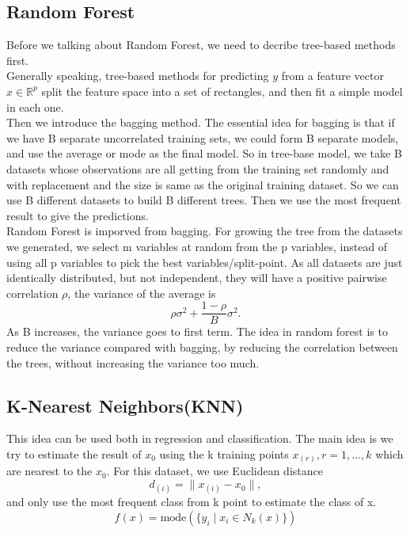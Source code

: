 \documentclass[12pt]{article}
\begin{document}
\subsection{Random Forest} 
Before we talking about Random Forest, we need to decribe tree-based methods first.\\ 
Generally speaking, tree-based methods for predicting $y$ from a feature vector $x\in \mathbb{R}^p$ split the feature space into a set of rectangles, and then fit a simple model in each one. \cite[p.305-310]{friedman2001elements} \\
Then we introduce the bagging method. The essential idea for bagging is that if we have B separate uncorrelated training sets, we could form B separate models, and use the average or mode as the final model. So in tree-base model, we take B datasets whose observations are all getting from the training set randomly and with replacement and the size is same as the original training dataset. So we can use B different datasets to build B different trees. Then we use the most frequent result to give the predictions. \cite[p282-283]{friedman2001elements} \\
Random Forest is imporved from bagging. For growing the tree from the datasets we generated, we select m variables at random from the p variables, instead of using all p variables to pick the best variables/split-point. As all datasets are just identically distributed, but not independent, they will have a positive pairwise correlation $\rho$, the variance of the average is $$\rho\sigma^2+\frac{1-\rho}{B}\sigma^2.$$ As B increases, the variance goes to first term. The idea in random forest is to reduce the variance compared with bagging, by reducing the correlation between the trees, without increasing the variance too much. \cite[p.606-607]{friedman2001elements}

\subsection{K-Nearest Neighbors(KNN)} 
This idea can be used both in regression and classification. The main idea is we try to estimate the result of $x_0$ using the k training points $x_{(r)}, r=1,...,k$ which are nearest to the $x_0$. For this dataset, we use Euclidean distance $$d_{(i)} = \lVert x_{(i)}-x_0 \rVert,$$ and only use the most frequent class from k point to estimate the class of x.\cite[p463-468]{friedman2001elements} $$f(x) = \text{mode}(\{ y_i \mid x_i \in N_k(x)\}) $$ 

\newpage
\end{document}
